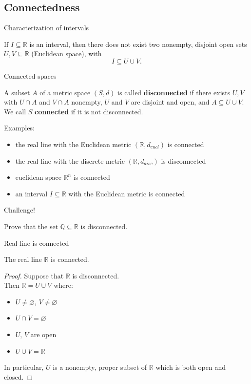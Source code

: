 \documentclass{beamer}
\begin{document}
\subsection{Connectedness}

\begin{frame}{Characterization of intervals}
\begin{thm}
If $I\subseteq \mathbb{R}$ is an interval, then there does not exist two nonempty, disjoint open sets $U,V\subseteq\mathbb{R}$ (Euclidean space), with
$$I\subseteq U\cup V.$$
\end{thm}
\end{frame}

\begin{frame}{Connected spaces}
\begin{defn}
A subset $A$ of a metric space $(S,d)$ is called \textbf{disconnected} if there exists $U,V$ with $U\cap A$ and $V\cap A$ nonempty, $U$ and $V$ are disjoint and open, and $A\subseteq U\cup V$.\\
\pause
We call $S$ \textbf{connected} if it is not disconnected.\\
\pause
\end{defn}
\pause
Examples:
\begin{itemize}
\pause
\item the real line with the Euclidean metric $(\mathbb{R},d_{eucl})$ is connected
\pause
\item the real line with the discrete metric $(\mathbb{R},d_{disc})$ is disconnected
\pause
\item euclidean space $\mathbb{R}^n$ is connected
\pause
\item an interval $I\subseteq \mathbb{R}$ with the Euclidean metric is connected
\end{itemize}
\end{frame}

\begin{frame}{Challenge!}
\begin{prob}
Prove that the set $\mathbb Q\subseteq \mathbb{R}$ is disconnected.
\end{prob}
\end{frame}

\begin{frame}{Real line is connected}
\begin{thm}
The real line $\mathbb{R}$ is connected.
\end{thm}
\pause
\begin{proof}
\pause
Suppose that $\mathbb{R}$ is disconnected.\\
\pause
Then $\mathbb{R} = U\cup V$ where:
\begin{itemize}
\pause
\item $U\neq\varnothing$, $V\neq\varnothing$
\pause
\item $U\cap V = \varnothing$
\pause
\item $U$, $V$ are open
\pause
\item $U\cup V = \mathbb{R}$
\end{itemize}
\pause
In particular, $U$ is a nonempty, proper subset of $\mathbb{R}$ which is both open and closed.
\end{proof}
\end{frame}
\end{document}
